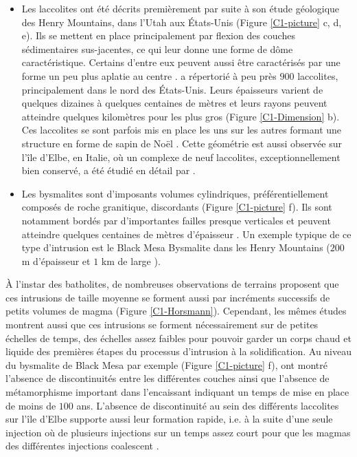 \begin{itemize}
\item Les laccolites ont été décrits premièrement par
 \citet{Gilbert:1877uk} suite à son étude géologique des Henry
 Mountains, dans l'Utah aux États-Unis (Figure \ref{C1-picture} c, d,
 e). Ils se mettent en place principalement par flexion des couches
 sédimentaires sus-jacentes, ce qui leur donne une forme de dôme
 caractéristique. Certains d'entre eux peuvent aussi être
 caractérisés par une forme un peu plus aplatie au centre
 \citep{Koch:1981if}. \citet{E:2015tl} a répertorié à peu près $900$
 laccolites, principalement dans le nord des États-Unis. Leurs
 épaisseurs varient de quelques dizaines à quelques centaines de
 mètres et leurs rayons peuvent atteindre quelques kilomètres pour
 les plus gros (Figure \ref{C1-Dimension} b). Ces laccolites se sont
 parfois mis en place les uns sur les autres formant une structure en
 forme de sapin de Noël \citep{E:2015tl}. Cette géométrie est aussi
 observée sur l'île d'Elbe, en Italie, où un complexe de neuf
 laccolites, exceptionnellement bien conservé, a été étudié en détail
 par \citet{Rocchi:2002jy}.

\item Les bysmalites sont d'imposants volumes cylindriques,
 préférentiellement composés de roche granitique, discordants (Figure
 \ref{C1-picture} f). Ils sont notamment bordés par d'importantes
 failles presque verticales et peuvent atteindre quelques centaines
 de mètres d'épaisseur \citep{Johnson:1973ho}. Un exemple typique de
 ce type d'intrusion est le Black Mesa Bysmalite dans les Henry
 Mountains ($200$ m d'épaisseur et $1$ km de large
 \citep{Morgan:2008hj}).
\end{itemize}

À l'instar des batholites, de nombreuses observations de terrains
proposent que ces intrusions de taille moyenne se forment aussi par
incréments successifs de petits volumes de magma
\citep{Habert:2004wg,Horsman:2005ct,Morgan:2008hj,Michel:2008gn,Leuthold:2012gja}
(Figure \ref{C1-Horsmann}). Cependant, les mêmes études montrent
aussi que ces intrusions se forment nécessairement sur de petites
échelles de temps, des échelles assez faibles pour pouvoir garder un
corps chaud et liquide des premières étapes du processus d'intrusion à
la solidification. Au niveau du bysmalite de Black Mesa par exemple
(Figure \ref{C1-picture} f), \citet{Habert:2004wg} ont montré
l'absence de discontinuités entre les différentes couches ainsi que
l'absence de métamorphisme important dans l'encaissant indiquant un
temps de mise en place de moins de $100$ ans. L'absence de
discontinuité au sein des différents laccolites sur l'île d'Elbe
supporte aussi leur formation rapide, i.e. à la suite d'une seule
injection où de plusieurs injections sur un temps assez court pour que
les magmas des différentes injections coalescent \citep{Roni:2014gt}.

